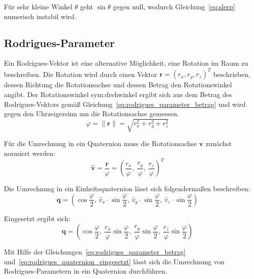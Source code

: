 Für sehr kleine Winkel $\theta$ geht $\sin\theta$ gegen null, wodurch Gleichung~\ref{eq:slerp} numerisch instabil wird.~\cite{Shoemake1985}


\subsection{Rodrigues-Parameter}
\label{sec:rodrigues_parameter}
Ein Rodrigues-Vektor ist eine alternative Möglichkeit, eine Rotation im Raum zu beschreiben.
Die Rotation wird durch einen Vektor $\mathbf{r} = (r_x, r_y, r_z)^T$ beschrieben,
dessen Richtung die Rotationsachse und dessen Betrag den Rotationswinkel angibt.
Der Rotationswinkel \gls{sym:drehwinkel} ergibt sich aus dem Betrag des Rodrigues-Vektors gemäß Gleichung~\ref{eq:rodrigues_parameter_betrag} und wird 
gegen den Uhrzeigersinn um die Rotationsachse gemessen.~\cite{Dai2015a,Bradski2008}
\begin{equation}
\varphi = \|\mathbf{r}\| = \sqrt{r_x^2 + r_y^2 + r_z^2}
\label{eq:rodrigues_parameter_betrag}
\end{equation}

Für die Umrechnung in ein Quaternion muss die Rotationsachse $\mathbf{v}$ zunächst normiert werden:
\begin{equation}
\hat{\mathbf{v}} = \frac{\mathbf{r}}{\varphi} = \left(\frac{r_x}{\varphi},\ \frac{r_y}{\varphi},\ \frac{r_z}{\varphi}\right)^T
\label{eq:rodrigues_parameter_normierung}
\end{equation}

Die Umrechnung in ein Einheitsquaternion lässt sich folgendermaßen beschreiben:
\begin{equation}
\mathbf{q} = \left(\cos\frac{\varphi}{2},\ \hat{v}_x \cdot \sin\frac{\varphi}{2},\ \hat{v}_y \cdot \sin\frac{\varphi}{2},\ \hat{v}_z \cdot \sin\frac{\varphi}{2}\right)
\label{eq:rodrigues_quaternion}
\end{equation}

Eingesetzt ergibt sich:
\begin{equation}
\mathbf{q} = \left(\cos\frac{\varphi}{2},\ \frac{r_x}{\varphi}\sin\frac{\varphi}{2},\ \frac{r_y}{\varphi}\sin\frac{\varphi}{2},\ \frac{r_z}{\varphi}\sin\frac{\varphi}{2}\right)
\label{eq:rodrigues_quaternion_eingesetzt}
\end{equation}

Mit Hilfe der Gleichungen~\ref{eq:rodrigues_parameter_betrag} und~\ref{eq:rodrigues_quaternion_eingesetzt} lässt sich die Umrechnung 
von Rodrigues-Parametern in ein Quaternion durchführen.~\cite{Dai2015a}

